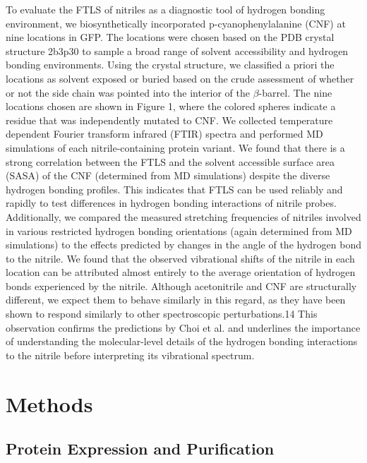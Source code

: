 To evaluate the FTLS of nitriles as a diagnostic tool of hydrogen bonding environment, we biosynthetically incorporated p-cyanophenylalanine (CNF) at nine locations in GFP.
The locations were chosen based on the PDB crystal structure 2b3p30 to sample a broad range of solvent accessibility and hydrogen bonding environments.
Using the crystal structure, we classified a priori the locations as solvent exposed or buried based on the crude assessment of whether or not the side chain was pointed into the interior of the $\beta$-barrel.
The nine locations chosen are shown in Figure 1, where the colored spheres indicate a residue that was independently mutated to CNF.
We collected temperature dependent Fourier transform infrared (FTIR) spectra and performed MD simulations of each nitrile-containing protein variant.
We found that there is a strong correlation between the FTLS and the solvent accessible surface area (SASA) of the CNF (determined from MD simulations) despite the diverse hydrogen bonding profiles.
This indicates that FTLS can be used reliably and rapidly to test differences in hydrogen bonding interactions of nitrile probes.
Additionally, we compared the measured stretching frequencies of nitriles involved in various restricted hydrogen bonding orientations (again determined from MD simulations) to the effects predicted by changes in the angle of the hydrogen bond to the nitrile.
We found that the observed vibrational shifts of the nitrile in each location can be attributed almost entirely to the average orientation of hydrogen bonds experienced by the nitrile.
Although acetonitrile and CNF are structurally different, we expect them to behave similarly in this regard, as they have been shown to respond similarly to other spectroscopic perturbations.14
This observation confirms the predictions by Choi et al. and underlines the importance of understanding the molecular-level details of the hydrogen bonding interactions to the nitrile  before interpreting its vibrational spectrum.

\section{Methods}\label{methods}

\subsection{Protein Expression and Purification}


